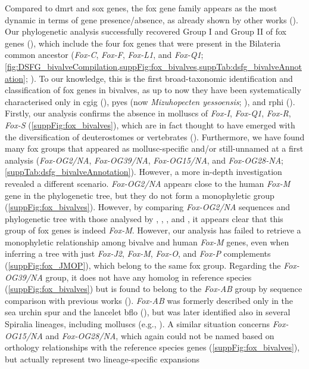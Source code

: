 Compared to \gls{dmrt} and \gls{sox} genes, the \gls{fox} gene family appears as the most dynamic in terms of gene presence/absence, as already shown by other works (). Our phylogenetic analysis successfully recovered Group I and Group II of \gls{fox} genes (), which include the four \gls{fox} genes that were present in the Bilateria common ancestor (\textit{Fox-C}, \textit{Fox-F}, \textit{Fox-L1}, and \textit{Fox-Q1}; \cref{fig:DSFG_bivalveCompilation,suppFig:fox_bivalves,suppTab:dsfg_bivalveAnnotation}; ). To our knowledge, this is the first broad-taxonomic identification and classification of \gls{fox} genes in bivalves, as up to now they have been systematically characterised only in \gls{cgig} (), \gls{pyes} (now \textit{Mizuhopecten yessoensis}; ), and \gls{rphi} (). Firstly, our analysis confirms the absence in molluscs of \textit{Fox-I}, \textit{Fox-Q1}, \textit{Fox-R}, \textit{Fox-S} (\cref{suppFig:fox_bivalves}), which are in fact thought to have emerged with the diversification of deuterostomes or vertebrates (). Furthermore, we have found many \gls{fox} groups that appeared as mollusc-specific and/or still-unnamed at a first analysis (\textit{Fox-OG2/NA}, \textit{Fox-OG39/NA}, \textit{Fox-OG15/NA}, and \textit{Fox-OG28-NA}; \cref{suppTab:dsfg_bivalveAnnotation}). However, a more in-depth investigation revealed a different scenario. \textit{Fox-OG2/NA} appears close to the human \textit{Fox-M} gene in the phylogenetic tree, but they do not form a monophyletic group (\cref{suppFig:fox_bivalves}). However, by comparing \textit{Fox-OG2/NA} sequences and phylogenetic tree with those analysed by , , , and , it appears clear that this group of \gls{fox} genes is indeed \textit{Fox-M}. However, our analysis has failed to retrieve a monophyletic relationship among bivalve and human \textit{Fox-M} genes, even when inferring a tree with just \textit{Fox-J2}, \textit{Fox-M}, \textit{Fox-O}, and \textit{Fox-P} complements (\cref{suppFig:fox_JMOP}), which belong to the same \gls{fox} group. Regarding the \textit{Fox-OG39/NA} group, it does not have any homolog in reference species (\cref{suppFig:fox_bivalves}) but is found to belong to the \textit{Fox-AB} group by sequence comparison with previous works (). \textit{Fox-AB} was formerly described only in the sea urchin \gls{spur} and the lancelet \gls{bflo} (), but was later identified also in several Spiralia lineages, including molluscs (e.g., ). A similar situation concerns \textit{Fox-OG15/NA} and \textit{Fox-OG28/NA}, which again could not be named based on orthology relationships with the reference species genes (\cref{suppFig:fox_bivalves}), but actually represent two lineage-specific expansions 